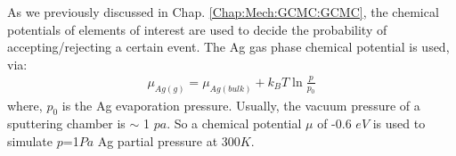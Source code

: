 As we previously discussed in Chap. \ref{Chap:Mech:GCMC:GCMC}, the chemical potentials of elements of interest are used to decide the probability of accepting/rejecting a certain event. The Ag gas phase chemical potential is used, via:
\begin{align}
 \mu_{Ag(g)} = \mu_{Ag(bulk)} + k_{B}T\ln{\frac{p}{p_0}}
 \label{Chap:Ag/ZnO:eq:mu_Ag}
\end{align}
where, $p_0$ is the Ag evaporation pressure. Usually, the vacuum pressure of a sputtering chamber is $\sim$ 1 $pa$. So a chemical potential $\mu$ of -0.6 $eV$ is used to simulate $p$=1$Pa$ Ag partial pressure at 300$K$.

\begingroup
\begin{figure}[!ht]
  \centering
  \label{Chap:Ag/W:fig:3a}
  \label{Chap:Ag/W:fig:3b}
  \\
  \label{Chap:Ag/W:fig:3c}

\end{figure}

